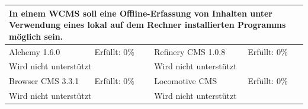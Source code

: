\begin{tabular}[!ht]{|l|l|l|l|}
\hline
\multicolumn{4}{|p{15cm}|}{\textbf{In einem WCMS soll eine Offline-Erfassung von Inhalten unter Verwendung eines lokal auf dem Rechner installierten Programms möglich sein.}} \\
\hline
  Alchemy 1.6.0 & \cellcolor{red}Erfüllt: 0\% & Refinery CMS 1.0.8 & \cellcolor{red}Erfüllt: 0\% \\
  \hline
  \multicolumn{2}{|p{7.5cm}|}{Wird nicht unterstützt} & \multicolumn{2}{p{7.5cm}|}{Wird nicht unterstützt} \\
  \hline
  Browser CMS 3.3.1 & \cellcolor{red}Erfüllt: 0\% & Locomotive CMS & \cellcolor{red}Erfüllt: 0\% \\
  \hline
  \multicolumn{2}{|p{7.5cm}|}{Wird nicht unterstützt} & \multicolumn{2}{p{7.5cm}|}{Wird nicht unterstützt} \\
\hline
\end{tabular}
\newline
\newline
\newline
